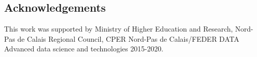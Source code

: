 \documentclass[conference]{IEEEtran}
\begin{document}
    
    \subsection*{Acknowledgements} 
    This work was supported by Ministry of Higher Education and Research, Nord-Pas de Calais Regional Council, CPER Nord-Pas de Calais/FEDER DATA Advanced data science and technologies 2015-2020.
    
    
    
     
    
\end{document}
